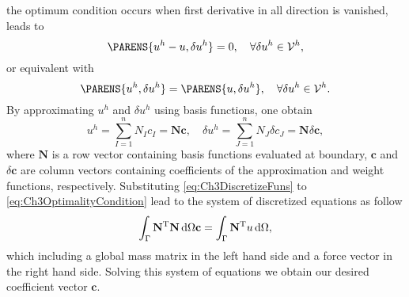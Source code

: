 the optimum condition occurs when first derivative in all direction is vanished, leads to
\begin{equation}
    \PARENS{u^h - u, \delta u^h} = 0, \quad \forall \delta u^h \in \mathcal{V}^h,
\end{equation}
or equivalent with
\begin{equation}
    \PARENS{u^h, \delta u^h} = \PARENS{u, \delta u^h}, \quad \forall \delta u^h \in \mathcal{V}^h.
    \label{eq:Ch3OptimalityCondition}
\end{equation}
By approximating $u^h$ and $\delta u ^ h$ using basis functions, one obtain
\begin{equation}
    u ^ h = \sum_{I=1}^{n} N_I c_I = \mathbf{N} \mathbf{c}, \quad \delta u ^ h = \sum_{J=1}^{n} N_J \delta c_J = \mathbf{N} \delta \mathbf{c},
    \label{eq:Ch3DiscretizeFuns}
\end{equation}
where $\mathbf{N}$ is a row vector containing basis functions evaluated at boundary, $\mathbf{c}$ and $\delta \mathbf{c}$ are column vectors containing coefficients of the approximation and weight functions, respectively. Substituting \ref{eq:Ch3DiscretizeFuns} to \ref{eq:Ch3OptimalityCondition} lead to the system of discretized equations as follow
\begin{equation}
    \int_{\Gamma} \mathbf{N}^\text{T} \mathbf{N} \dif \Omega \mathbf{c} = \int_{\Gamma} \mathbf{N} ^ \text{T} u \dif \Omega,
\end{equation}
which including a global mass matrix in the left hand side and a force vector in the right hand side. Solving this system of equations we obtain our desired coefficient vector $\mathbf{c}$.

